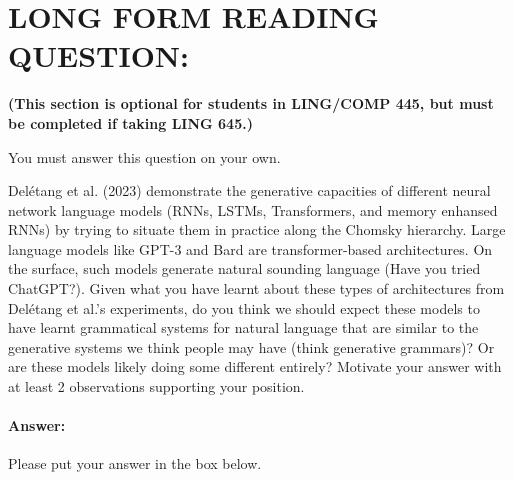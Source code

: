 \documentclass[10pt]{article}
\begin{document}
\newpage
\section*{LONG FORM READING QUESTION:} 
\textbf{(This section is optional for students in LING/COMP 445, but must be completed if taking LING 645.)}

You must answer this question on your own.

Del\'etang et al. (2023) demonstrate the generative capacities of different neural network language models (RNNs, LSTMs, Transformers, and memory enhansed RNNs) by trying to situate them in practice along the Chomsky hierarchy. Large language models like GPT-3 and Bard are transformer-based architectures. On the surface, such models generate natural sounding language (Have you tried ChatGPT?). Given what you have learnt about these types of architectures from Del\'etang et al.'s experiments, do you think we should expect these models to have learnt grammatical systems for natural language that are similar to the generative systems we think people may have (think generative grammars)? Or are these models likely doing some different entirely? Motivate your answer with at least 2 observations supporting your position.

\paragraph{Answer:} Please put your answer in the box below.
\end{document}
